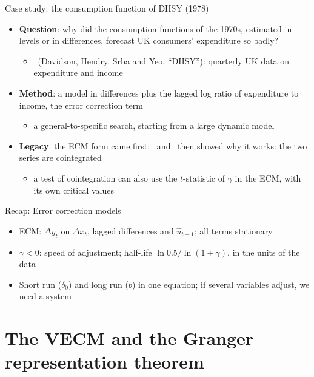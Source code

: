 \begin{frame}{Case study: the consumption function of DHSY (1978)}
\itemsize{\small}
\begin{itemize}
    \item \textbf{Question}: why did the consumption functions of the 1970s, estimated in levels or in differences, forecast UK consumers' expenditure so badly?
    \begin{itemize}
        \item {}\ (Davidson, Hendry, Srba and Yeo, ``DHSY''): quarterly UK data on expenditure and income
    \end{itemize}
    \item \textbf{Method}: a model in differences plus the lagged log ratio of expenditure to income, the error correction term
    \begin{itemize}
        \item a general-to-specific search, starting from a large dynamic model
    \end{itemize}
    \item \textbf{Legacy}: the ECM form came first; \ and \ then showed why it works: the two series are cointegrated
    \begin{itemize}
        \item a test of cointegration can also use the $t$-statistic of $\gamma$ in the ECM, with its own critical values 
    \end{itemize}
\end{itemize}
\end{frame}

\begin{frame}{Recap: Error correction models}
\itemsize{\small}
\begin{itemize}
    \item ECM: $\Delta y_t$ on $\Delta x_t$, lagged differences and $\hat u_{t-1}$; all terms stationary
    \item $\gamma < 0$: speed of adjustment; half-life $\ln 0.5/\ln(1 + \gamma)$, in the units of the data
    \item Short run ($\delta_0$) and long run ($b$) in one equation; if several variables adjust, we need a system
\end{itemize}
\end{frame}


\section{The VECM and the Granger representation theorem}

